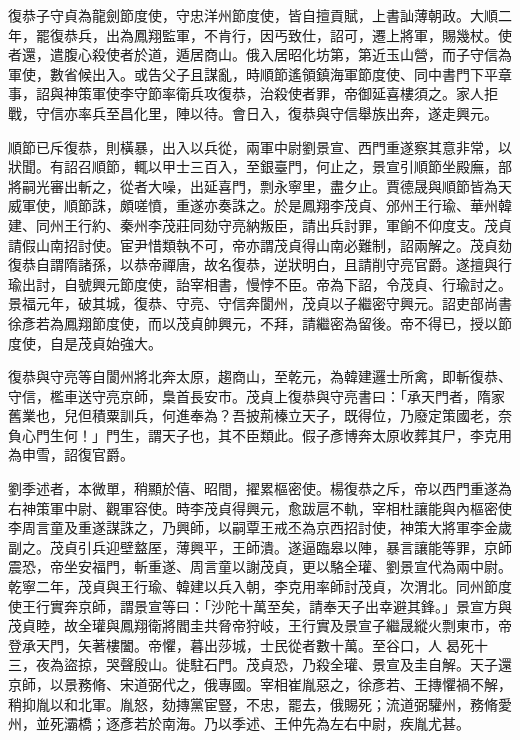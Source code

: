 \begin{pinyinscope}
 復恭子守貞為龍劍節度使，守忠洋州節度使，皆自擅貢賦，上書訕薄朝政。大順二年，罷復恭兵，出為鳳翔監軍，不肯行，因丐致仕，詔可，遷上將軍，賜幾杖。使者還，遣腹心殺使者於道，遁居商山。俄入居昭化坊第，第近玉山營，而子守信為軍使，數省候出入。或告父子且謀亂，時順節遙領鎮海軍節度使、同中書門下平章事，詔與神策軍使李守節率衛兵攻復恭，治殺使者罪，帝御延喜樓須之。家人拒戰，守信亦率兵至昌化里，陣以待。會日入，復恭與守信舉族出奔，遂走興元。



 順節已斥復恭，則橫暴，出入以兵從，兩軍中尉劉景宣、西門重遂察其意非常，以狀聞。有詔召順節，輒以甲士三百入，至銀臺門，何止之，景宣引順節坐殿廡，部將嗣光審出斬之，從者大噪，出延喜門，剽永寧里，盡夕止。賈德晟與順節皆為天威軍使，順節誅，頗嗟憤，重遂亦奏誅之。於是鳳翔李茂貞、邠州王行瑜、華州韓建、同州王行約、秦州李茂莊同劾守亮納叛臣，請出兵討罪，軍餉不仰度支。茂貞請假山南招討使。宦尹惜類執不可，帝亦謂茂貞得山南必難制，詔兩解之。茂貞劾復恭自謂隋諸孫，以恭帝禪唐，故名復恭，逆狀明白，且請削守亮官爵。遂擅與行瑜出討，自號興元節度使，詒宰相書，慢悖不臣。帝為下詔，令茂貞、行瑜討之。景福元年，破其城，復恭、守亮、守信奔閬州，茂貞以子繼密守興元。詔吏部尚書徐彥若為鳳翔節度使，而以茂貞帥興元，不拜，請繼密為留後。帝不得已，授以節度使，自是茂貞始強大。



 復恭與守亮等自閬州將北奔太原，趨商山，至乾元，為韓建邏士所禽，即斬復恭、守信，檻車送守亮京師，梟首長安市。茂貞上復恭與守亮書曰：「承天門者，隋家舊業也，兒但積粟訓兵，何進奉為？吾披荊榛立天子，既得位，乃廢定策國老，奈負心門生何！」門生，謂天子也，其不臣類此。假子彥博奔太原收葬其尸，李克用為申雪，詔復官爵。



 劉季述者，本微單，稍顯於僖、昭間，擢累樞密使。楊復恭之斥，帝以西門重遂為右神策軍中尉、觀軍容使。時李茂貞得興元，愈跋扈不軌，宰相杜讓能與內樞密使李周言童及重遂謀誅之，乃興師，以嗣覃王戒丕為京西招討使，神策大將軍李金歲副之。茂貞引兵迎壁盩厔，薄興平，王師潰。遂逼臨皋以陣，暴言讓能等罪，京師震恐，帝坐安福門，斬重遂、周言童以謝茂貞，更以駱全瓘、劉景宣代為兩中尉。乾寧二年，茂貞與王行瑜、韓建以兵入朝，李克用率師討茂貞，次渭北。同州節度使王行實奔京師，謂景宣等曰：「沙陀十萬至矣，請奉天子出幸避其鋒。」景宣方與茂貞睦，故全瓘與鳳翔衛將閻圭共脅帝狩岐，王行實及景宣子繼晟縱火剽東市，帝登承天門，矢著樓闔。帝懼，暮出莎城，士民從者數十萬。至谷口，人曷死十三，夜為盜掠，哭聲殷山。徙駐石門。茂貞恐，乃殺全瓘、景宣及圭自解。天子還京師，以景務脩、宋道弼代之，俄專國。宰相崔胤惡之，徐彥若、王摶懼禍不解，稍抑胤以和北軍。胤怒，劾摶黨宦豎，不忠，罷去，俄賜死；流道弼驩州，務脩愛州，並死灞橋；逐彥若於南海。乃以季述、王仲先為左右中尉，疾胤尤甚。




\end{pinyinscope}
